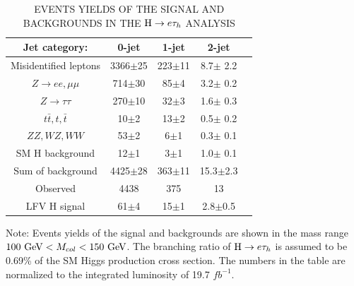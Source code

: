 \begin{table}[htbp]
\centering
\caption{EVENTS YIELDS OF THE SIGNAL AND BACKGROUNDS IN THE $\mathrm{H} \to e \tau_{h}$ ANALYSIS}\label{tab:EventYieldTable_100_to_150} 
\begin{threeparttable}
\begin{tabular}{c|cccl}\hline
Jet category:                     &    0-jet    & 1-jet          & 2-jet          \\\hline
Misidentified leptons           &     3366$\pm$25      & 223$\pm$11     &  8.7$\pm$ 2.2  \\
$Z\to e e, \mu\mu$    &  714$\pm$30       & 85$\pm$4       &  3.2$\pm$ 0.2  \\
$Z\to \tau\tau$           &      270$\pm$10       & 32$\pm$3       &  1.6$\pm$ 0.3  \\
$t\bar{t},t,\bar{t}$      &  10$\pm$2        &  13$\pm$2      &  0.5$\pm$ 0.2   \\
$ ZZ, WZ, WW$        &             53$\pm$2         &  6$\pm$1       &  0.3$\pm$ 0.1   \\
SM H  background     &                12$\pm$1         &  3$\pm$1       &  1.0$\pm$ 0.1   \\
Sum of background       &               4425$\pm$28      & 363$\pm$11     &  15.3$\pm$2.3   \\\hline
Observed                   &            4438             & 375            & 13            \\ \hline
LFV H  signal             &           61$\pm$4        & 15$\pm$1       &  2.8$\pm$0.5    \\\hline
\end{tabular}
\begin{tablenotes}
\small
\item Note: Events yields of the signal and backgrounds are shown in the mass range $100~\textrm{GeV}<M_{col}<150~\textrm{GeV}$. The branching ratio of $\mathrm{H} \to e \tau_{h}$ is assumed to be 0.69\% of the SM Higgs production cross section. The numbers in the table are normalized to the integrated luminosity of 19.7 $fb^{-1}$.
\end{tablenotes}
\end{threeparttable}
\end{table}



